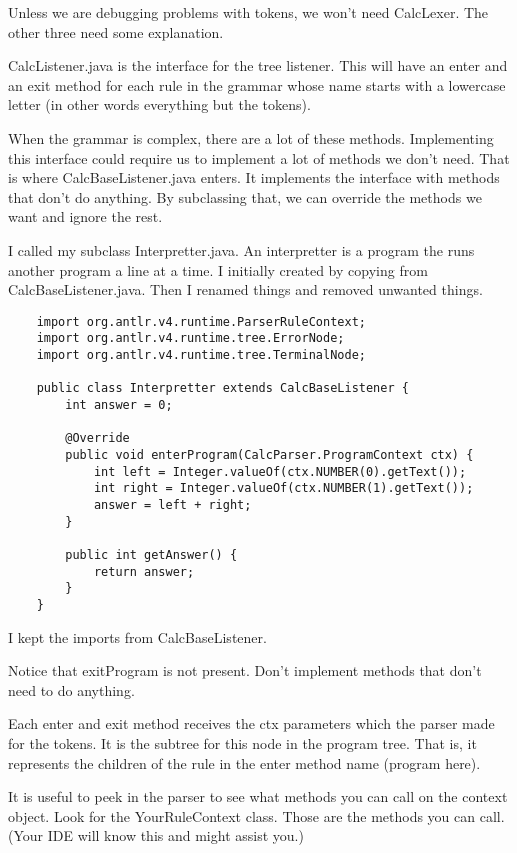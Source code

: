 Unless we are debugging problems with tokens, we won't need CalcLexer.
The other three need some explanation.

CalcListener.java is the interface for the tree listener. This will
have an enter and an exit method for each rule in the grammar whose
name starts with a lowercase letter (in other words everything but the
tokens).

When the grammar is complex, there are a lot of these methods. Implementing
this interface could require us to implement a lot of methods we don't
need. That is where CalcBaseListener.java enters. It implements the
interface with methods that don't do anything. By subclassing that,
we can override the methods we want and ignore the rest.

I called my subclass Interpretter.java. An interpretter is a program
the runs another program a line at a time. I initially created by copying
from CalcBaseListener.java. Then I renamed things and removed unwanted
things.

{\footnotesize
\begin{verbatim}
    import org.antlr.v4.runtime.ParserRuleContext;
    import org.antlr.v4.runtime.tree.ErrorNode;
    import org.antlr.v4.runtime.tree.TerminalNode;
    
    public class Interpretter extends CalcBaseListener {
        int answer = 0;
    
        @Override
        public void enterProgram(CalcParser.ProgramContext ctx) {
            int left = Integer.valueOf(ctx.NUMBER(0).getText());
            int right = Integer.valueOf(ctx.NUMBER(1).getText());
            answer = left + right;
        }
    
        public int getAnswer() {
            return answer;
        }
    }
\end{verbatim}
}

I kept the imports from CalcBaseListener.

Notice that exitProgram is not present. Don't implement methods that
don't need to do anything.

Each enter and exit method receives the ctx parameters which the
parser made for the tokens. It is the subtree for this node in the program
tree. That is, it represents the children of the rule in the enter method
name (program here).

It is useful to peek in the parser to see what methods you can call
on the context object. Look for the YourRuleContext class. Those
are the methods you can call. (Your IDE will know this and might
assist you.)

